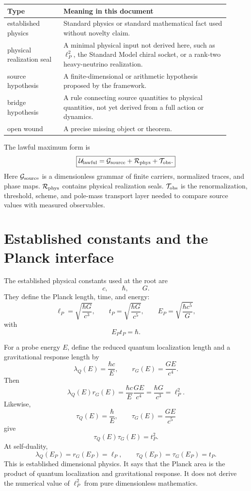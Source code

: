 \documentclass[11pt]{article}
\newcommand{\status}[1]{\textsf{#1}}
\newcommand{\seal}{\status{physical realization seal}}
\newcommand{\bridge}{\status{bridge hypothesis}}
\newcommand{\sourcehyp}{\status{source hypothesis}}
\newcommand{\std}{\status{established physics}}
\newcommand{\wound}{\status{open wound}}
\begin{document}
\begin{center}
\begin{tabular}{p{0.23\linewidth}p{0.68\linewidth}}
\toprule
Type & Meaning in this document\\
\midrule
\std & Standard physics or standard mathematical fact used without novelty claim.\\
\seal & A minimal physical input not derived here, such as \(\ell_P^2\), the Standard Model chiral socket, or a rank-two heavy-neutrino realization.\\
\sourcehyp & A finite-dimensional or arithmetic hypothesis proposed by the framework.\\
\bridge & A rule connecting source quantities to physical quantities, not yet derived from a full action or dynamics.\\
\wound & A precise missing object or theorem.\\
\bottomrule
\end{tabular}
\end{center}

The lawful maximum form is
\[
\boxed{
\mathcal U_{\rm lawful}
=
\mathcal G_{\rm source}
+
\mathcal R_{\rm phys}
+
\mathcal T_{\rm obs}.
}
\]
Here \(\mathcal G_{\rm source}\) is a dimensionless grammar of finite carriers, normalized traces, and phase maps. \(\mathcal R_{\rm phys}\) contains physical realization seals. \(\mathcal T_{\rm obs}\) is the renormalization, threshold, scheme, and pole-mass transport layer needed to compare source values with measured observables.

\section{Established constants and the Planck interface}

The established physical constants used at the root are
\[
c,\qquad \hbar,\qquad G.
\]
They define the Planck length, time, and energy:
\[
\ell_P=\sqrt{\frac{\hbar G}{c^3}},\qquad
t_P=\sqrt{\frac{\hbar G}{c^5}},\qquad
E_P=\sqrt{\frac{\hbar c^5}{G}},
\]
with
\[
E_Pt_P=\hbar.
\]

For a probe energy \(E\), define the reduced quantum localization length and a gravitational response length by
\[
\lambda_Q(E)=\frac{\hbar c}{E},\qquad
r_G(E)=\frac{GE}{c^4}.
\]
Then
\[
\lambda_Q(E)r_G(E)
=
\frac{\hbar c}{E}\frac{GE}{c^4}
=
\frac{\hbar G}{c^3}
=
\ell_P^2.
\]
Likewise,
\[
\tau_Q(E)=\frac{\hbar}{E},\qquad
\tau_G(E)=\frac{GE}{c^5}
\]
give
\[
\tau_Q(E)\tau_G(E)=t_P^2.
\]
At self-duality,
\[
\lambda_Q(E_P)=r_G(E_P)=\ell_P,\qquad
\tau_Q(E_P)=\tau_G(E_P)=t_P.
\]
This is established dimensional physics. It says that the Planck area is the product of quantum localization and gravitational response. It does not derive the numerical value of \(\ell_P^2\) from pure dimensionless mathematics.
\end{document}
